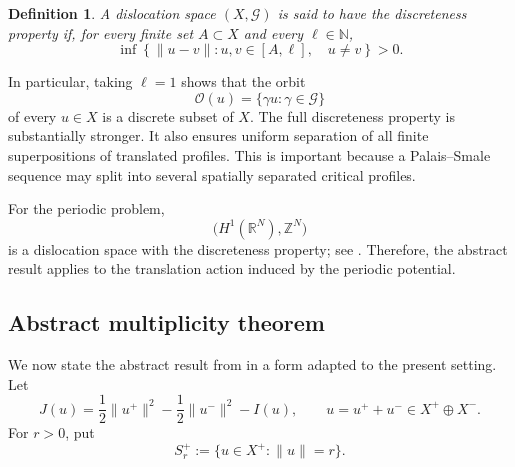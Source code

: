 \documentclass[10pt,a4paper]{amsart}
\numberwithin{equation}{section}
\newtheorem{definition}[theorem]{Definition}
\newcommand{\R}{\mathbb{R}}
\newcommand{\Z}{\mathbb{Z}}
\newcommand{\N}{\mathbb{N}}
\newcommand{\cG}{\mathcal{G}}
\begin{document}
\begin{definition}
A dislocation space $(X,\cG)$ is said to have the \emph{discreteness
property} if, for every finite set $A\subset X$ and every $\ell\in\N$,
\[
\inf
\left\{
\|u-v\|:
u,v\in[A,\ell],\quad u\neq v
\right\}
>0.
\]
\end{definition}

In particular, taking $\ell=1$ shows that the orbit
\[
\mathcal{O}(u)=\{\gamma u:\gamma\in\cG\}
\]
of every $u\in X$ is a discrete subset of $X$. The full discreteness
property is substantially stronger. It also ensures uniform separation of
all finite superpositions of translated profiles. This is important because
a Palais--Smale sequence may split into several spatially separated
critical profiles.

For the periodic problem,
\[
\bigl(H^1(\R^N),\Z^N\bigr)
\]
is a dislocation space with the discreteness property; see
\cite[Example~2.13]{BBS2025}. Therefore, the
abstract result applies to the translation action induced by the periodic
potential.

\subsection{Abstract multiplicity theorem}

We now state the abstract result from \cite{BBS2025} in a form adapted to
the present setting. Let
\[
J(u)
=
\frac12\|u^+\|^2
-
\frac12\|u^-\|^2
-
I(u),
\qquad
u=u^++u^-\in X^+\oplus X^-.
\]
For $r>0$, put
\[
S_r^+
:=
\{u\in X^+:\|u\|=r\}.
\]
\end{document}
